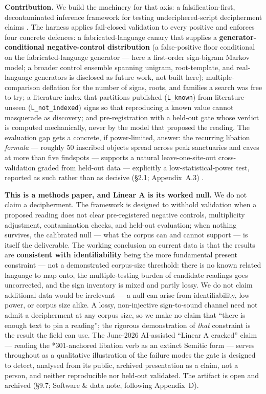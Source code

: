 \textbf{Contribution.} We build the machinery for that axis: a
falsification-first, decontaminated inference framework for testing
undeciphered-script decipherment claims \citep{braovic2024}. The harness
applies fail-closed validation to every positive and enforces four
concrete defences: a fabricated-language canary that supplies a
\textbf{generator-conditional negative-control distribution} (a
false-positive floor conditional on the fabricated-language generator ---
here a first-order sign-bigram Markov model; a broader control ensemble
spanning unigram, root-template, and real-language generators is
disclosed as future work, not built here); multiple-comparison deflation
for the number of signs, roots, and families a search was free to try; a
literature index that partitions published (\texttt{L\_known}) from
literature-unseen (\texttt{L\_not\_indexed}) signs so that reproducing a
known value cannot masquerade as discovery; and pre-registration with a
held-out gate whose verdict is computed mechanically, never by the model
that proposed the reading. The evaluation gap gets a concrete, if
power-limited, answer: the recurring libation \emph{formula} --- roughly
50 inscribed objects spread across peak sanctuaries and caves at more
than five findspots --- supports a natural leave-one-site-out
cross-validation graded from held-out data --- explicitly a
low-statistical-power test, reported as such rather than as decisive
(\S2.1; Appendix~A.3) \citep{braovic2024}.

\textbf{This is a methods paper, and Linear A is its worked null.} We do
not claim a decipherment. The framework is designed to withhold
validation when a proposed reading does not clear pre-registered negative
controls, multiplicity adjustment, contamination checks, and held-out
evaluation; when nothing survives, the calibrated null --- what the
corpus can and cannot support --- is itself the deliverable. The working
conclusion on current data is that the results are \textbf{consistent
with identifiability} being the more fundamental present constraint ---
not a demonstrated corpus-size threshold: there is no known related
language to map onto, the multiple-testing burden of candidate readings
goes uncorrected, and the sign inventory is mixed and partly lossy. We do
not claim additional data would be irrelevant --- a null can arise from
identifiability, low power, or corpus size alike. A lossy, non-injective
sign-to-sound channel need not admit a decipherment at any corpus size,
so we make no claim that ``there is enough text to pin a reading''; the
rigorous demonstration of \emph{that} constraint is the result the field
can use. The June-2026 AI-assisted ``Linear A cracked'' claim --- reading
the *301-anchored libation verb as an extinct Semitic form --- serves
throughout as a qualitative illustration of the failure modes the gate is
designed to detect, analysed from its public, archived presentation as a
claim, not a person, and neither reproducible nor held-out validated.
The artifact is open and archived (\S9.7; Software \& data note,
following Appendix~D).

